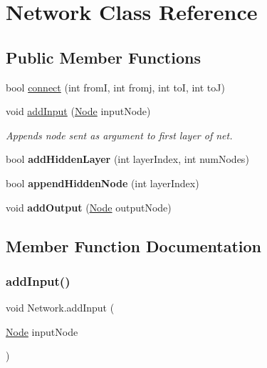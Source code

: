 \hypertarget{class_network}{}\section{Network Class Reference}
\label{class_network}
\subsection*{Public Member Functions}
\begin{DoxyCompactItemize}
\item 
bool \mbox{\hyperlink{class_network_a52c2afe3c1b3e462b5b18353d09c7a1b}{connect}} (int fromI, int fromj, int toI, int toJ)
\item 
void \mbox{\hyperlink{class_network_af6fbcc77b9555ee0a1e418139ac23918}{add\+Input}} (\mbox{\hyperlink{class_node}{Node}} input\+Node)
\begin{DoxyCompactList}\small\item\em Appends node sent as argument to first layer of net. \end{DoxyCompactList}\item 
\mbox{\label{class_network_ac9a4adc38e0d136244168fea987b2784}} 
bool {\bfseries add\+Hidden\+Layer} (int layer\+Index, int num\+Nodes)
\item 
\mbox{\label{class_network_a56f655a6b8575f46b03adbd5f624630f}} 
bool {\bfseries append\+Hidden\+Node} (int layer\+Index)
\item 
\mbox{\label{class_network_a5628c625df1dd36371a70f255145bbcc}} 
void {\bfseries add\+Output} (\mbox{\hyperlink{class_node}{Node}} output\+Node)
\end{DoxyCompactItemize}


\subsection{Member Function Documentation}
\mbox{\label{class_network_af6fbcc77b9555ee0a1e418139ac23918}} 
\subsubsection{\texorpdfstring{add\+Input()}{addInput()}}
{\footnotesize\ttfamily void Network.\+add\+Input (\begin{DoxyParamCaption}\item[{\mbox{\hyperlink{class_node}{Node}}}]{input\+Node }\end{DoxyParamCaption})}



